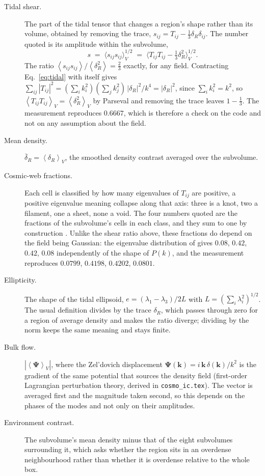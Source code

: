 \documentclass[12pt]{article}
\newcommand{\bk}{\mathbf{k}}
\newcommand{\avg}[1]{\left\langle #1 \right\rangle}
\begin{document}
\begin{description}
\item[Tidal shear.] The part of the tidal tensor that changes a region's shape
  rather than its volume, obtained by removing the trace,
  $s_{ij} = T_{ij} - \tfrac{1}{3}\delta_R \delta_{ij}$. The number quoted is its
  amplitude within the subvolume,
  \begin{equation}
    \label{eq:shear}
    s \;=\; \Big\langle s_{ij}s_{ij} \Big\rangle_V^{1/2}
      \;=\; \Big\langle T_{ij}T_{ij} - \tfrac{1}{3}\delta_R^2 \Big\rangle_V^{1/2}.
  \end{equation}
  The ratio $\avg{s_{ij}s_{ij}} / \avg{\delta_R^2} = \tfrac{2}{3}$ exactly, for
  any field. Contracting Eq.~\eqref{eq:tidal} with itself gives
  $\sum_{ij} |T_{ij}|^2 = (\sum_i k_i^2)(\sum_j k_j^2)\,|\delta_R|^2/k^4 =
  |\delta_R|^2$, since $\sum_i k_i^2 = k^2$, so
  $\avg{T_{ij}T_{ij}}_V = \avg{\delta_R^2}_V$ by Parseval and removing the trace
  leaves $1 - \tfrac{1}{3}$. The measurement reproduces $0.6667$, which is
  therefore a check on the code and not on any assumption about the field.

\item[Mean density.] $\bar\delta_R = \avg{\delta_R}_V$, the smoothed density
  contrast averaged over the subvolume.

\item[Cosmic-web fractions.] Each cell is classified by how many eigenvalues of
  $T_{ij}$ are positive, a positive eigenvalue meaning collapse along that axis:
  three is a knot, two a filament, one a sheet, none a void. The four numbers
  quoted are the fractions of the subvolume's cells in each class, and they sum
  to one by construction \citep{Hahn2007}. Unlike the shear ratio above, these
  fractions do depend on the field being Gaussian: the eigenvalue distribution
  of \citet{Doroshkevich1970} gives $0.08$, $0.42$, $0.42$, $0.08$ independently
  of the shape of $P(k)$, and the measurement reproduces $0.0799$, $0.4198$,
  $0.4202$, $0.0801$.

\item[Ellipticity.] The shape of the tidal ellipsoid,
  $e = (\lambda_1 - \lambda_3)/2L$ with $L = (\sum_i \lambda_i^2)^{1/2}$. The
  usual definition divides by the trace $\delta_R$, which passes through zero
  for a region of average density and makes the ratio diverge; dividing by the
  norm keeps the same meaning and stays finite.

\item[Bulk flow.] $|\avg{\boldsymbol{\Psi}}_V|$, where the Zel'dovich
  displacement $\boldsymbol\Psi(\bk) = i\,\bk\,\delta(\bk)/k^2$ is the gradient
  of the same potential that sources the density field (first-order Lagrangian
  perturbation theory, derived in \texttt{cosmo\_ic.tex}). The vector is
  averaged first and the magnitude taken second, so this depends on the phases
  of the modes and not only on their amplitudes.

\item[Environment contrast.] The subvolume's mean density minus that of the
  eight subvolumes surrounding it, which asks whether the region sits in an
  overdense neighbourhood rather than whether it is overdense relative to the
  whole box.
\end{description}
\end{document}
